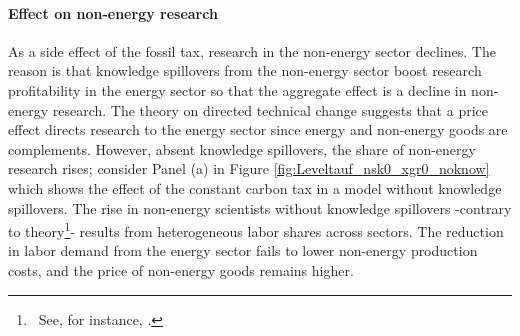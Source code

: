 \begin{figure}[h!!]
\begin{minipage}[]{0.32\textwidth}
\end{minipage}
\end{figure}

\paragraph{Effect on non-energy research}
As a side effect of the fossil tax, research in the non-energy sector declines. 
The reason is that knowledge spillovers from the non-energy sector boost research profitability in the energy sector so that the aggregate effect is a decline in non-energy research. The theory on directed technical change suggests that a price effect directs research to the energy sector since energy and non-energy goods are complements.  However, absent knowledge spillovers, the share of non-energy research rises; consider Panel (a) in Figure \ref{fig:Leveltauf_nsk0_xgr0_noknow} which shows the effect of the constant carbon tax in a model without knowledge spillovers. The rise in non-energy scientists without knowledge spillovers -contrary to  theory\footnote{\ See, for instance,  \cite{Hemous2021DirectedEconomics}.}- results from heterogeneous labor shares across sectors. The reduction in labor demand from the energy sector fails to lower non-energy production costs, and the price of non-energy goods remains higher. 

